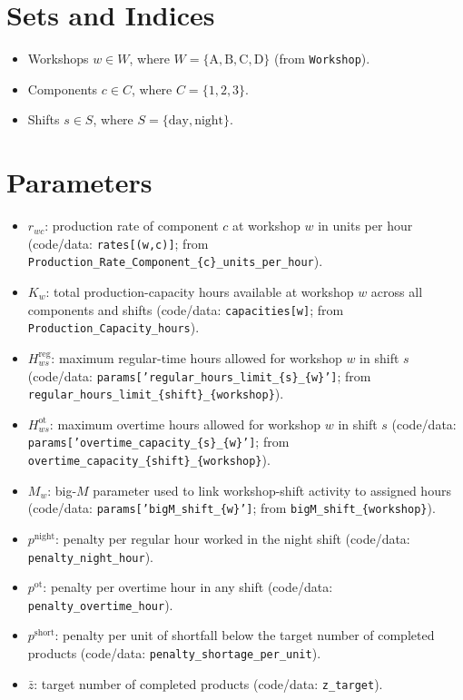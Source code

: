 \section*{Sets and Indices}

\begin{itemize}
    \item Workshops $w \in W$, where $W=\{\text{A},\text{B},\text{C},\text{D}\}$ (from \texttt{Workshop}).
    \item Components $c \in C$, where $C=\{1,2,3\}$.
    \item Shifts $s \in S$, where $S=\{\text{day},\text{night}\}$.
\end{itemize}

\section*{Parameters}

\begin{itemize}
    \item $r_{wc}$: production rate of component $c$ at workshop $w$ in units per hour (code/data: \texttt{rates[(w,c)]}; from \texttt{Production\_Rate\_Component\_\{c\}\_units\_per\_hour}).
    \item $K_w$: total production-capacity hours available at workshop $w$ across all components and shifts (code/data: \texttt{capacities[w]}; from \texttt{Production\_Capacity\_hours}).
    \item $H^{\mathrm{reg}}_{ws}$: maximum regular-time hours allowed for workshop $w$ in shift $s$ (code/data: \texttt{params['regular\_hours\_limit\_\{s\}\_\{w\}']}; from \texttt{regular\_hours\_limit\_\{shift\}\_\{workshop\}}).
    \item $H^{\mathrm{ot}}_{ws}$: maximum overtime hours allowed for workshop $w$ in shift $s$ (code/data: \texttt{params['overtime\_capacity\_\{s\}\_\{w\}']}; from \texttt{overtime\_capacity\_\{shift\}\_\{workshop\}}).
    \item $M_w$: big-$M$ parameter used to link workshop-shift activity to assigned hours (code/data: \texttt{params['bigM\_shift\_\{w\}']}; from \texttt{bigM\_shift\_\{workshop\}}).
    \item $p^{\mathrm{night}}$: penalty per regular hour worked in the night shift (code/data: \texttt{penalty\_night\_hour}).
    \item $p^{\mathrm{ot}}$: penalty per overtime hour in any shift (code/data: \texttt{penalty\_overtime\_hour}).
    \item $p^{\mathrm{short}}$: penalty per unit of shortfall below the target number of completed products (code/data: \texttt{penalty\_shortage\_per\_unit}).
    \item $\bar z$: target number of completed products (code/data: \texttt{z\_target}).
\end{itemize}

